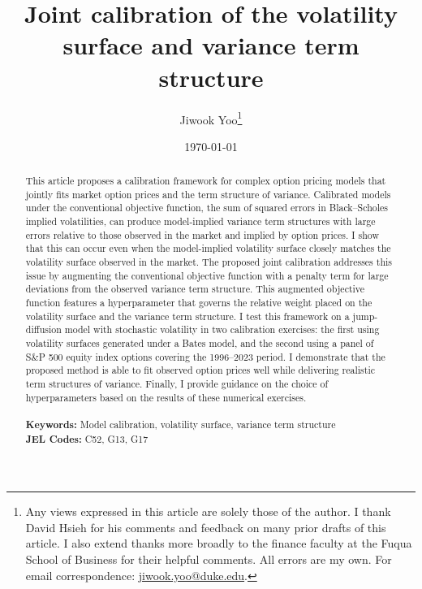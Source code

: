 \documentclass[12pt]{article}
\begin{document}
\begin{titlepage}
\title{Joint calibration of the volatility surface and variance term structure}
\author{Jiwook Yoo\thanks{Any views expressed in this article are solely those of the author. I thank David Hsieh for his comments and feedback on many prior drafts of this article. I also extend thanks more broadly to the finance faculty at the Fuqua School of Business for their helpful comments. All errors are my own. For email correspondence: \href{mailto:jiwook.yoo@duke.edu}{jiwook.yoo@duke.edu}. }}
\date{\today}
\maketitle
\vspace{-1.5em}

\begin{abstract}
\noindent This article proposes a calibration framework for complex option pricing models that jointly fits market option prices and the term structure of variance. Calibrated models under the conventional objective function, the sum of squared errors in Black–Scholes implied volatilities, can produce model-implied variance term structures with large errors relative to those observed in the market and implied by option prices. I show that this can occur even when the model-implied volatility surface closely matches the volatility surface observed in the market. The proposed joint calibration addresses this issue by augmenting the conventional objective function with a penalty term for large deviations from the observed variance term structure. This augmented objective function features a hyperparameter that governs the relative weight placed on the volatility surface and the variance term structure. I test this framework on a jump-diffusion model with stochastic volatility in two calibration exercises: the first using volatility surfaces generated under a Bates model, and the second using a panel of S\&P 500 equity index options covering the 1996–2023 period. I demonstrate that the proposed method is able to fit observed option prices well while delivering realistic term structures of variance. Finally, I provide guidance on the choice of hyperparameters based on the results of these numerical exercises.  \\
\vspace{0in}\\
\noindent\textbf{Keywords:} Model calibration, volatility surface, variance term structure \\
\noindent\textbf{JEL Codes:} C52, G13, G17\\

\bigskip
\end{abstract}
\setcounter{page}{0}
\thispagestyle{empty}
\end{titlepage}
\pagebreak \newpage
\end{document}
